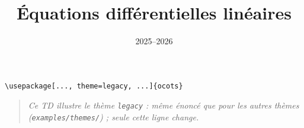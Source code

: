 \documentclass[11pt]{ocots-td}
\title{Équations différentielles linéaires}
\date{2025--2026}
\begin{document}
\maketitle

\begin{lstlisting}
\usepackage[..., theme=legacy, ...]{ocots}
\end{lstlisting}
\begin{quote}\itshape
Ce TD illustre le th\`eme \texttt{legacy} : m\^eme \'enonc\'e que pour les
autres th\`emes (\texttt{examples/themes/}) ; seule cette ligne change.
\end{quote}


\end{document}
